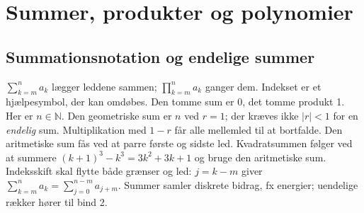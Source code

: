 \section{Summer, produkter og polynomier}
\label{sec:polynomier}
\subsection{Summationsnotation og endelige summer}
$\sum_{k=m}^n a_k$ lægger leddene sammen;
$\prod_{k=m}^n a_k$ ganger dem. Indekset er et hjælpesymbol, der kan
omdøbes. Den tomme sum er 0, det tomme produkt 1.
Her er $n\in\mathbb N$. Den geometriske sum er $n$ ved $r=1$;
der kræves ikke $|r|<1$ for en \emph{endelig} sum. Multiplikation med
$1-r$ får alle mellemled til at bortfalde. Den aritmetiske sum fås ved
at parre første og sidste led. Kvadratsummen følger ved at summere
$(k+1)^3-k^3=3k^2+3k+1$ og bruge den aritmetiske sum.
Indeksskift skal flytte både grænser og led: $j=k-m$ giver
$\sum_{k=m}^n a_k=\sum_{j=0}^{n-m}a_{j+m}$.
Summer samler diskrete bidrag, fx energier; uendelige rækker hører til bind 2.

